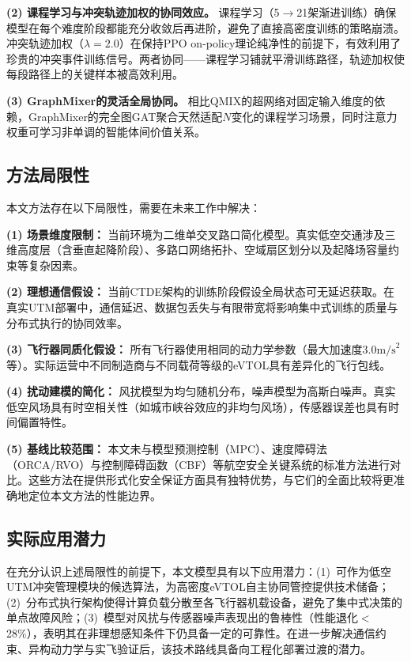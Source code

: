 \documentclass[12pt,a4paper,UTF8]{ctexart}
\begin{document}
\textbf{(2) 课程学习与冲突轨迹加权的协同效应。} 课程学习（5$\to$21架渐进训练）确保模型在每个难度阶段都能充分收敛后再进阶，避免了直接高密度训练的策略崩溃。冲突轨迹加权（$\lambda=2.0$）在保持PPO on-policy理论纯净性的前提下，有效利用了珍贵的冲突事件训练信号。两者协同——课程学习铺就平滑训练路径，轨迹加权使每段路径上的关键样本被高效利用。

\textbf{(3) GraphMixer的灵活全局协同。} 相比QMIX的超网络对固定输入维度的依赖，GraphMixer的完全图GAT聚合天然适配$N$变化的课程学习场景，同时注意力权重可学习非单调的智能体间价值关系。

\subsection{方法局限性}

本文方法存在以下局限性，需要在未来工作中解决：

\textbf{(1) 场景维度限制：} 当前环境为二维单交叉路口简化模型。真实低空交通涉及三维高度层（含垂直起降阶段）、多路口网络拓扑、空域扇区划分以及起降场容量约束等复杂因素。

\textbf{(2) 理想通信假设：} 当前CTDE架构的训练阶段假设全局状态可无延迟获取。在真实UTM部署中，通信延迟、数据包丢失与有限带宽将影响集中式训练的质量与分布式执行的协同效率。

\textbf{(3) 飞行器同质化假设：} 所有飞行器使用相同的动力学参数（最大加速度$3.0\text{m/s}^2$等）。实际运营中不同制造商与不同载荷等级的eVTOL具有差异化的飞行包线。

\textbf{(4) 扰动建模的简化：} 风扰模型为均匀随机分布，噪声模型为高斯白噪声。真实低空风场具有时空相关性（如城市峡谷效应的非均匀风场），传感器误差也具有时间偏置特性。

\textbf{(5) 基线比较范围：} 本文未与模型预测控制（MPC）、速度障碍法（ORCA/RVO）与控制障碍函数（CBF）等航空安全关键系统的标准方法进行对比。这些方法在提供形式化安全保证方面具有独特优势，与它们的全面比较将更准确地定位本文方法的性能边界。

\subsection{实际应用潜力}

在充分认识上述局限性的前提下，本文模型具有以下应用潜力：(1)~可作为低空UTM冲突管理模块的候选算法，为高密度eVTOL自主协同管控提供技术储备；(2)~分布式执行架构使得计算负载分散至各飞行器机载设备，避免了集中式决策的单点故障风险；(3)~模型对风扰与传感器噪声表现出的鲁棒性（性能退化$<$28\%），表明其在非理想感知条件下仍具备一定的可靠性。在进一步解决通信约束、异构动力学与实飞验证后，该技术路线具备向工程化部署过渡的潜力。
\end{document}
